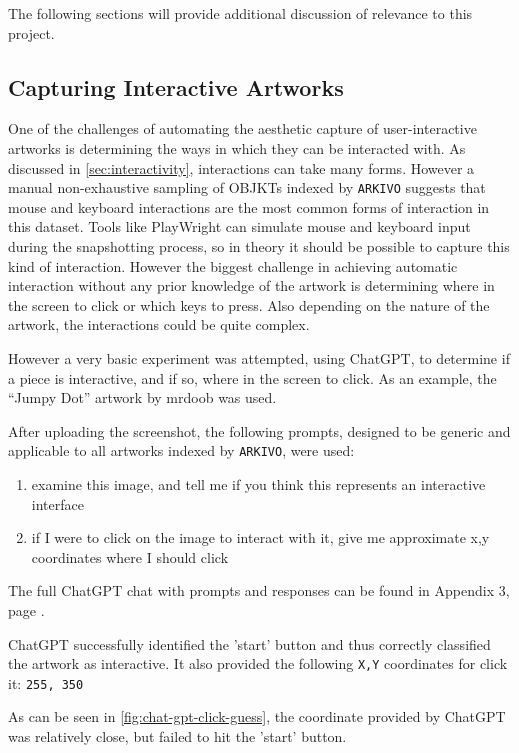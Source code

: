 The following sections will provide additional discussion of relevance to this project.

\subsection{Capturing Interactive Artworks}
\label{subsec:capture-interactive}

One of the challenges of automating the aesthetic capture of user-interactive artworks is determining the ways in which they can be interacted with. As discussed in \autoref{sec:interactivity}, interactions can take many forms. However a manual non-exhaustive sampling of OBJKTs indexed by \texttt{ARKIVO} suggests that mouse and keyboard interactions are the most common forms of interaction in this dataset. Tools like PlayWright can simulate mouse and keyboard input during the snapshotting process, so in theory it should be possible to capture this kind of interaction. However the biggest challenge in achieving automatic interaction without any prior knowledge of the artwork is determining where in the screen to click or which keys to press. Also depending on the nature of the artwork, the interactions could be quite complex.

However a very basic experiment was attempted, using ChatGPT, to determine if a piece is interactive, and if so, where in the screen to click. As an example, the ``Jumpy Dot'' artwork by mrdoob was used.

After uploading the screenshot, the following prompts, designed to be generic and applicable to all artworks indexed by \texttt{ARKIVO}, were used:

\begin{enumerate}
	\item examine this image, and tell me if you think this represents an interactive interface
	\item if I were to click on the image to interact with it, give me approximate x,y coordinates where I should click
\end{enumerate}


The full ChatGPT chat with prompts and responses can be found in Appendix 3, page \pageref{chap:chatgpt-mouse}.

ChatGPT successfully identified the 'start' button and thus correctly classified the artwork as interactive. It also provided the following \texttt{X,Y} coordinates for click it: \texttt{255, 350}

As can be seen in \autoref{fig:chat-gpt-click-guess}, the coordinate provided by ChatGPT was relatively close, but failed to hit the 'start' button.

